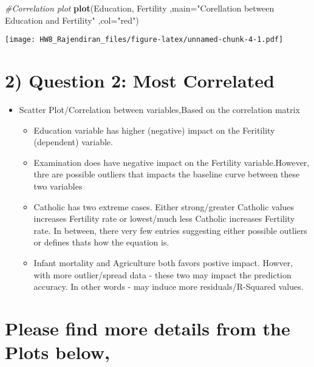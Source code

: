 \documentclass[]{article}
\newenvironment{Shaded}{\begin{snugshade}}{\end{snugshade}}
\newcommand{\CommentTok}[1]{\textcolor[rgb]{0.56,0.35,0.01}{\textit{#1}}}
\newcommand{\DataTypeTok}[1]{\textcolor[rgb]{0.13,0.29,0.53}{#1}}
\newcommand{\KeywordTok}[1]{\textcolor[rgb]{0.13,0.29,0.53}{\textbf{#1}}}
\newcommand{\NormalTok}[1]{#1}
\newcommand{\StringTok}[1]{\textcolor[rgb]{0.31,0.60,0.02}{#1}}
\providecommand{\tightlist}{%
  \setlength{\itemsep}{0pt}\setlength{\parskip}{0pt}}
\begin{document}
\begin{Shaded}
\begin{Highlighting}[]
\CommentTok{#Correlation plot}
\KeywordTok{plot}\NormalTok{(Education, Fertility}
\NormalTok{     ,}\DataTypeTok{main=}\StringTok{"Corellation between Education and Fertility"}
\NormalTok{     ,}\DataTypeTok{col=}\StringTok{"red"}\NormalTok{)}
\end{Highlighting}
\end{Shaded}

\texttt{[image: HW8\_Rajendiran\_files/figure-latex/unnamed-chunk-4-1.pdf]}

\hypertarget{question-2-most-correlated}{%
\section{2) Question 2: Most
Correlated}\label{question-2-most-correlated}}

\begin{itemize}
\tightlist
\item
  Scatter Plot/Correlation between variables,Based on the correlation
  matrix

  \begin{itemize}
  \tightlist
  \item
    Education variable has higher (negative) impact on the Feritility
    (dependent) variable.
  \item
    Examination does have negative impact on the Fertility
    variable.However, thre are possible outliers that impacts the
    baseline curve between these two variables
  \item
    Catholic has two extreme cases. Either strong/greater Catholic
    values increases Fertility rate or lowest/much less Catholic
    increases Fertility rate. In between, there very few entries
    suggesting either possible outliers or defines thats how the
    equation is.
  \item
    Infant mortality and Agriculture both favors postive impact. Howver,
    with more outlier/spread data - these two may impact the prediction
    accuracy. In other words - may induce more residuals/R-Squared
    values.
  \end{itemize}
\end{itemize}

\hypertarget{please-find-more-details-from-the-plots-below}{%
\section{Please find more details from the Plots
below,}\label{please-find-more-details-from-the-plots-below}}
\end{document}

